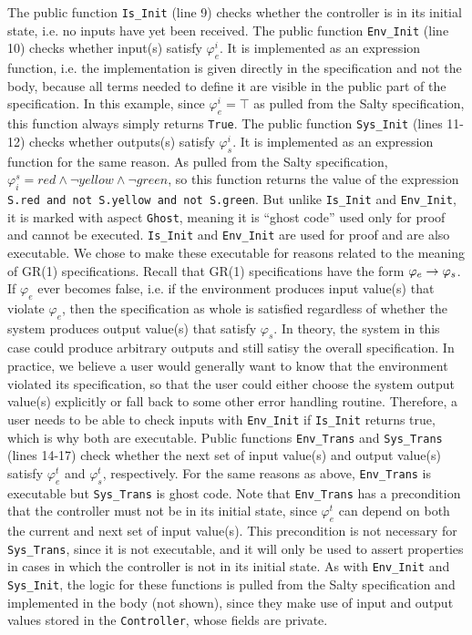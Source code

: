 \documentclass[runningheads]{llncs}
\begin{document}
The public function \lstinline{Is_Init} (line 9) checks whether the controller is in its initial state, i.e. no inputs have yet been received. 
The public function \lstinline{Env_Init} (line 10) checks whether input(s) satisfy $\varphi_e^i$. 
It is implemented as an expression function, i.e. the implementation is given directly in the specification and not the body, 
because all terms needed to define it are visible in the public part of the specification. 
In this example, since $\varphi_e^i = \top$ as pulled from the Salty specification, this function always simply returns \lstinline{True}. 
The public function \lstinline{Sys_Init} (lines 11-12) checks whether outputs(s) satisfy $\varphi_s^i$. 
It is implemented as an expression function for the same reason.  
As pulled from the Salty specification, $\varphi^s_i = red \land \lnot yellow \land \lnot green$, so this function returns the value of
the expression \lstinline{S.red and not S.yellow and not S.green}.
But unlike \lstinline{Is_Init} and \lstinline{Env_Init}, it is marked with aspect \lstinline{Ghost}, 
meaning it is ``ghost code'' used only for proof and cannot be executed. 
\lstinline{Is_Init} and \lstinline{Env_Init} are used for proof and are also executable. 
We chose to make these executable for reasons related to the meaning of GR(1) specifications. 
Recall that GR(1) specifications have the form $\varphi_e \rightarrow \varphi_s$. 
If $\varphi_e$ ever becomes false, i.e. if the environment produces input value(s) that violate $\varphi_e$, then the specification as whole 
is satisfied regardless of whether the system produces output value(s) that satisfy $\varphi_s$. 
In theory, the system in this case could produce arbitrary outputs and still satisy the overall specification. 
In practice, we believe a user would generally want to know that the environment violated its specification, 
so that the user could either choose the system output value(s) explicitly or fall back to some other error handling routine. 
Therefore, a user needs to be able to check inputs with \lstinline{Env_Init} if \lstinline{Is_Init} returns true, 
which is why both are executable.
Public functions \lstinline{Env_Trans} and \lstinline{Sys_Trans} (lines 14-17) check whether the next set of input value(s) and output value(s) 
satisfy $\varphi_e^t$ and $\varphi_s^t$, respectively. 
For the same reasons as above, \lstinline{Env_Trans} is executable but \lstinline{Sys_Trans} is ghost code. 
Note that \lstinline{Env_Trans} has a precondition that the controller must not be in its initial state, 
since $\varphi_e^t$ can depend on both the current and next set of input value(s). 
This precondition is not necessary for \lstinline{Sys_Trans}, since it is not executable, and it will only be used to 
assert properties in cases in which the controller is not in its initial state. 
As with \lstinline{Env_Init} and \lstinline{Sys_Init}, the logic for these functions is pulled from the Salty specification and 
implemented in the body (not shown), since they make use of input and output values stored in the \lstinline{Controller}, whose fields are private.
\end{document}
